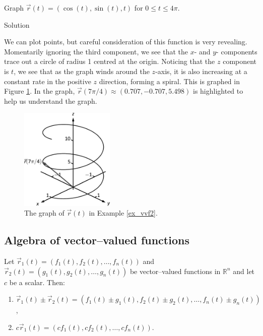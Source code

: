 \begin{example}\label{ex_vvf2}
Graph $\vec r(t) = \left( \cos (t),\sin (t),t\right)$ for $0\leq t\leq 4\pi$.

Solution 

We can plot points, but careful consideration of this function is very revealing. Momentarily ignoring the third component, we see that the $x$- and $y$- components trace out a circle of radius 1 centred at the origin. Noticing that the $z$ component is $t$, we see that as the graph winds around the $z$-axis, it is also increasing at a constant rate in the positive $z$ direction, forming a spiral. This is graphed in Figure \ref{fig_vector_fun_2}. In the graph, $\vec r(7\pi/4)\approx (0.707,-0.707,5.498) $ is highlighted to help us understand the graph.




\end{example}

\begin{figure}
	\begin{center}
			\includegraphics[width=0.4\textwidth]{fig_vector_fun_2}
	\caption{The graph of $\vec r(t)$ in Example \ref{ex_vvf2}.}
	\label{fig_vector_fun_2}
	\end{center}
\end{figure}

\subsection{Algebra of vector--valued functions}\label{subsec:alg_vect}
\ifanalysis
Let $\vec r_1(t)=\left( f_1(t),f_2(t),\ldots,f_n(t)\right)$ and $\vec r_2(t)=\left( g_1(t),g_2(t),\ldots,g_n(t)\right)$ be vector--valued functions in $\mathbb{R}^n$ and let $c$ be a scalar. Then:
\begin{enumerate}[align=left]
	\item $\vec r_1(t) \pm \vec r_2(t) = \left( f_1(t)\pm g_1(t),f_2(t)\pm g_2(t),\ldots,f_n(t)\pm g_n(t)\right)$,
	\item	$c\vec r_1(t) = \left( cf_1(t),cf_2(t),\ldots,cf_n(t)\right)$.
\end{enumerate}
\fi


